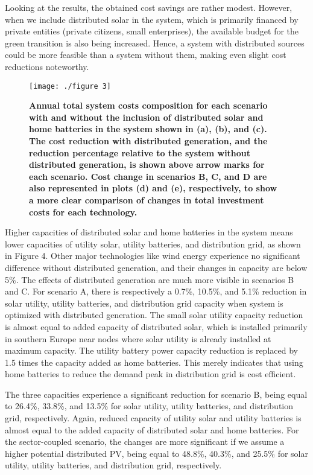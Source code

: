 \documentclass[review]{elsarticle}
\begin{document}
	Looking at the results, the obtained cost savings are rather modest. However, when we include distributed solar in the system, which is primarily financed by private entities (private citizens, small enterprises), the available budget for the green transition is also being increased. Hence, a system with distributed sources could be more feasible than a system without them, making even slight cost reductions noteworthy.
	
	\begin{figure}
		\texttt{[image: ./figure 3]}
		\caption{\textbf{Annual total system costs composition for each scenario with and without the inclusion of distributed solar and home batteries in the system shown in (a), (b), and (c). The cost reduction with distributed generation, and the reduction percentage relative to the system without distributed generation, is shown above arrow marks for each scenario. Cost change in scenarios B, C, and D  are also represented in plots (d) and (e), respectively, to show a more clear comparison of changes in total investment costs for each technology.}}
		\label{fig:costs}
	\end{figure}
	
	Higher capacities of distributed solar and home batteries in the system means lower capacities of utility solar, utility batteries, and distribution grid, as shown in Figure 4. Other major technologies like wind energy experience no significant difference without distributed generation, and their changes in capacity are below 5\%. The effects of distributed generation are much more visible in scenarios B and C. For scenario A, there is respectively a 0.7\%, 10.5\%, and 5.1\% reduction in solar utility, utility batteries, and distribution grid capacity when system is optimized with distributed generation. The small solar utility capacity reduction is almost equal to added capacity of distributed solar, which is installed primarily in southern Europe near nodes where solar utility is already installed at maximum capacity. The utility battery power capacity reduction is replaced by 1.5 times the capacity added as home batteries. This merely indicates that using home batteries to reduce the demand peak in distribution grid is cost efficient.
	
	The three capacities experience a significant reduction for scenario B, being equal to 26.4\%, 33.8\%, and 13.5\% for solar utility, utility batteries, and distribution grid, respectively. Again, reduced capacity of utility solar and utility batteries is almost equal to the added capacity of distributed solar and home batteries. For the sector-coupled scenario, the changes are more significant if we assume a higher potential distributed PV, being equal to 48.8\%, 40.3\%, and 25.5\% for solar utility, utility batteries, and distribution grid, respectively. 
	
\end{document}
